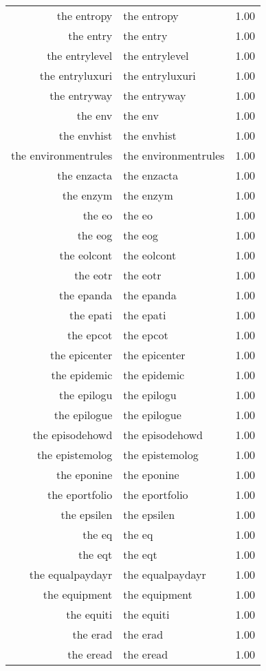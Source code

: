 \begin{table}[ht]
\begin{tabular}{rlr}
  the entropy & the entropy & 1.00 \\ 
  the entry & the entry & 1.00 \\ 
  the entrylevel & the entrylevel & 1.00 \\ 
  the entryluxuri & the entryluxuri & 1.00 \\ 
  the entryway & the entryway & 1.00 \\ 
  the env & the env & 1.00 \\ 
  the envhist & the envhist & 1.00 \\ 
  the environmentrules & the environmentrules & 1.00 \\ 
  the enzacta & the enzacta & 1.00 \\ 
  the enzym & the enzym & 1.00 \\ 
  the eo & the eo & 1.00 \\ 
  the eog & the eog & 1.00 \\ 
  the eolcont & the eolcont & 1.00 \\ 
  the eotr & the eotr & 1.00 \\ 
  the epanda & the epanda & 1.00 \\ 
  the epati & the epati & 1.00 \\ 
  the epcot & the epcot & 1.00 \\ 
  the epicenter & the epicenter & 1.00 \\ 
  the epidemic & the epidemic & 1.00 \\ 
  the epilogu & the epilogu & 1.00 \\ 
  the epilogue & the epilogue & 1.00 \\ 
  the episodehowd & the episodehowd & 1.00 \\ 
  the epistemolog & the epistemolog & 1.00 \\ 
  the eponine & the eponine & 1.00 \\ 
  the eportfolio & the eportfolio & 1.00 \\ 
  the epsilen & the epsilen & 1.00 \\ 
  the eq & the eq & 1.00 \\ 
  the eqt & the eqt & 1.00 \\ 
  the equalpaydayr & the equalpaydayr & 1.00 \\ 
  the equipment & the equipment & 1.00 \\ 
  the equiti & the equiti & 1.00 \\ 
  the erad & the erad & 1.00 \\ 
  the eread & the eread & 1.00 \\ 

\end{tabular}
\end{table}
